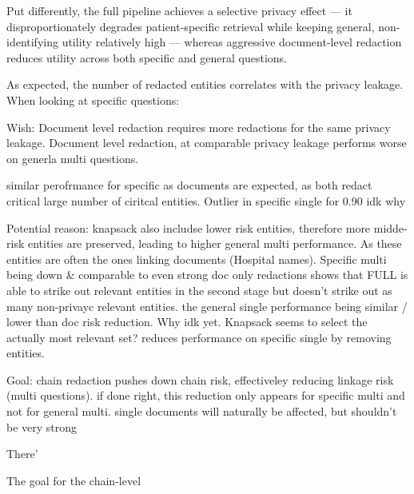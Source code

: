 Put differently, the full pipeline achieves a selective privacy effect — it disproportionately degrades patient-specific retrieval while keeping general, non-identifying utility relatively high — whereas aggressive document-level redaction reduces utility across both specific and general questions.


As expected, the number of redacted entities correlates with the privacy leakage. When looking at specific questions: 

Wish: Document level redaction requires more redactions for the same privacy leakage. Document level redaction, at comparable privacy leakage performs worse on generla multi questions. 

similar perofrmance for specific as documents are expected, as both redact critical large number of ciritcal entities. Outlier in specific single for 0.90 idk why

Potential reason: knapsack also includse lower risk entities, therefore more midde-risk entities are preserved, leading to higher general multi performance. As these entities are often the ones linking documents (Hospital names). Specific multi being down \& comparable to even strong doc only redactions shows that FULL is able to strike out relevant entities in the second stage but doesn't strike out as many non-privayc relevant entities.
the general single performance being similar /  lower than doc risk reduction. Why idk yet. Knapsack seems to select the actually most relevant set? reduces performance on specific single by removing entities.

Goal: chain redaction pushes down chain risk, effectiveley reducing linkage risk (multi questions). if done right, this reduction only appears for specific multi and not for general multi. single documents will naturally be affected, but shouldn't be very strong

There'

The goal for the chain-level



